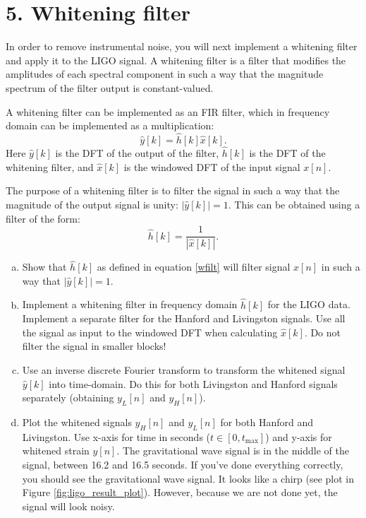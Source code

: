 \section{5. Whitening filter}

In order to remove instrumental noise, you will next implement a
whitening filter and apply it to the LIGO signal. A whitening filter
is a filter that modifies the amplitudes of each spectral component in
such a way that the magnitude spectrum of the filter output is constant-valued.

A whitening filter can be implemented as an FIR filter, which in frequency domain can be implemented as a multiplication:
\begin{equation}
\hat{y}[k] = \hat{h}[k]\hat{x}[k].
\end{equation}
Here $\hat{y}[k]$ is the DFT of the output of the filter, $\hat{h}[k]$ is the DFT of the whitening filter, and $\hat{x}[k]$ is the windowed DFT of the input signal $x[n]$. 

The purpose of a whitening filter is to filter the signal in such a way that the magnitude of the output signal is unity: $|\hat{y}[k]|=1$. This can be  obtained using a filter of the form:
\begin{equation}
\hat{h}[k]=\frac{1}{|\hat{x}[k]|}.
\label{wfilt}
\end{equation}
\begin{enumerate}[a)]

\item Show that $\hat{h}[k]$ as defined in equation \ref{wfilt} will filter signal $x[n]$ in such a way that $|\hat{y}[k]|=1$. 


\item Implement a whitening filter in frequency domain $\hat{h}[k]$
  for the LIGO data. Implement a separate filter for the Hanford and
  Livingston signals. Use all the signal as input to the windowed
  DFT when calculating $\hat{x}[k]$. Do not filter the signal in
  smaller blocks!

\item Use an inverse discrete Fourier transform to transform the
  whitened signal $\hat{y}[k]$ into time-domain. Do this for both
  Livingston and Hanford signals separately (obtaining $y_L[n]$ and
  $y_H[n]$). 

\item Plot the whitened signals $y_H[n]$ and $y_L[n]$ for both Hanford
  and Livingston. Use x-axis for time in seconds
  ($t\in[0,t_{\mathrm{max}}]$) and y-axis for whitened strain
  $y[n]$. The gravitational wave signal is in the middle of the
  signal, between 16.2 and 16.5 seconds. If you've done everything
  correctly, you should see the gravitational wave signal. It looks
  like a chirp (see plot in Figure \ref{fig:ligo_result_plot}). However, because we are not
  done yet, the signal will look noisy.

\end{enumerate}

